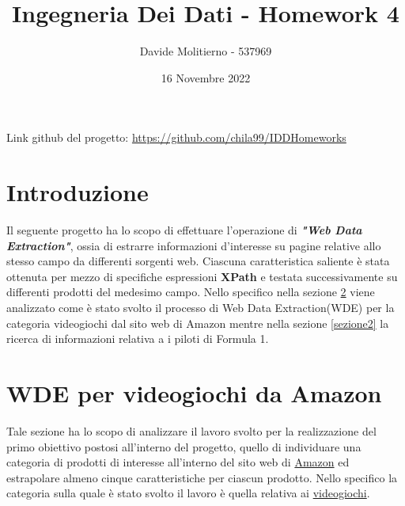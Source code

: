 \documentclass[12pt, letterpaper]{article}
\title{Ingegneria Dei Dati - Homework 4}
\author{Davide Molitierno - 537969}
\date{16 Novembre 2022}
\begin{document}
\maketitle
Link github del progetto: \url{https://github.com/chila99/IDDHomeworks}

\section{Introduzione}
Il seguente progetto ha lo scopo di effettuare l'operazione di \emph{\textbf{"Web Data Extraction"}}, ossia di estrarre informazioni d'interesse su pagine relative allo stesso campo da differenti sorgenti web. Ciascuna caratteristica saliente è stata ottenuta per mezzo di specifiche espressioni \textbf{XPath} e testata successivamente su differenti prodotti del medesimo campo.
Nello specifico nella sezione \ref{sezione1} viene analizzato come è stato svolto il processo di Web Data Extraction(WDE) per la categoria videogiochi dal sito web di Amazon mentre nella sezione \ref{sezione2} la ricerca di informazioni relativa a i piloti di Formula 1.
\section{WDE per videogiochi da Amazon}\label{sezione1}
Tale sezione ha lo scopo di analizzare il lavoro svolto per la realizzazione del primo obiettivo postosi all'interno del progetto, quello di individuare una categoria di prodotti di interesse all'interno del sito web di \href{https://www.amazon.it}{Amazon} ed estrapolare almeno cinque caratteristiche per ciascun prodotto. Nello specifico la categoria sulla quale è stato svolto il lavoro è quella relativa ai \href{https://www.amazon.it/s/ref=nb_sb_noss?__mk_it_IT=ÅMÅŽÕÑ&url=search-alias%3Dvideogames&field-keywords=&crid=2GIVFOZXKUAZD&sprefix=%2Cvideogames%2C110}{videogiochi}.
\end{document}
